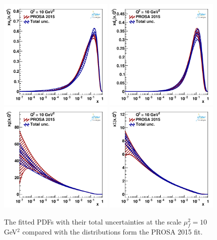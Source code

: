 \documentclass[12pt]{article}
\begin{document}
\begin{figure}
    \centering
    \includegraphics[width=0.49\textwidth]{figs/q2_10_pdf_uv.pdf}
    \includegraphics[width=0.49\textwidth]{figs/q2_10_pdf_dv.pdf}\\
    \includegraphics[width=0.49\textwidth]{figs/q2_10_pdf_g.pdf}
    \includegraphics[width=0.49\textwidth]{figs/q2_10_pdf_Sea.pdf}
    \caption{The fitted PDFs with their total uncertainties at the scale $\mu^2_f=10$ GeV$^2$ compared with the distributions form the PROSA 2015 fit.}
    \label{fig:pdfs}
\end{figure}
\end{document}
